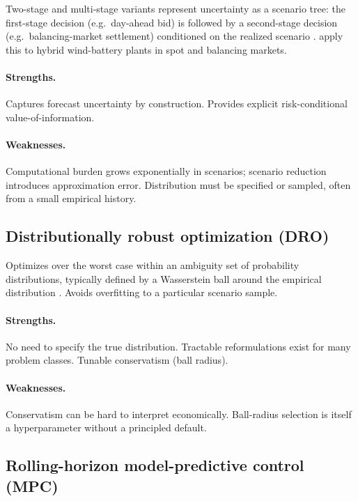 \documentclass[11pt]{article}
\begin{document}
Two-stage and multi-stage variants represent uncertainty as a scenario tree: the first-stage decision (e.g.\ day-ahead bid) is followed by a second-stage decision (e.g.\ balancing-market settlement) conditioned on the realized scenario \citep{krishnamurthy2018stochastic}. \citet{zhu2024hpp} apply this to hybrid wind-battery plants in spot and balancing markets.

\paragraph{Strengths.} Captures forecast uncertainty by construction. Provides explicit risk-conditional value-of-information.

\paragraph{Weaknesses.} Computational burden grows exponentially in scenarios; scenario reduction introduces approximation error. Distribution must be specified or sampled, often from a small empirical history.

\subsection{Distributionally robust optimization (DRO)}

Optimizes over the worst case within an ambiguity set of probability distributions, typically defined by a Wasserstein ball around the empirical distribution \citep{xie2021wasserstein, ma2022wasserstein}. Avoids overfitting to a particular scenario sample.

\paragraph{Strengths.} No need to specify the true distribution. Tractable reformulations exist for many problem classes. Tunable conservatism (ball radius).

\paragraph{Weaknesses.} Conservatism can be hard to interpret economically. Ball-radius selection is itself a hyperparameter without a principled default.

\subsection{Rolling-horizon model-predictive control (MPC)}
\end{document}
